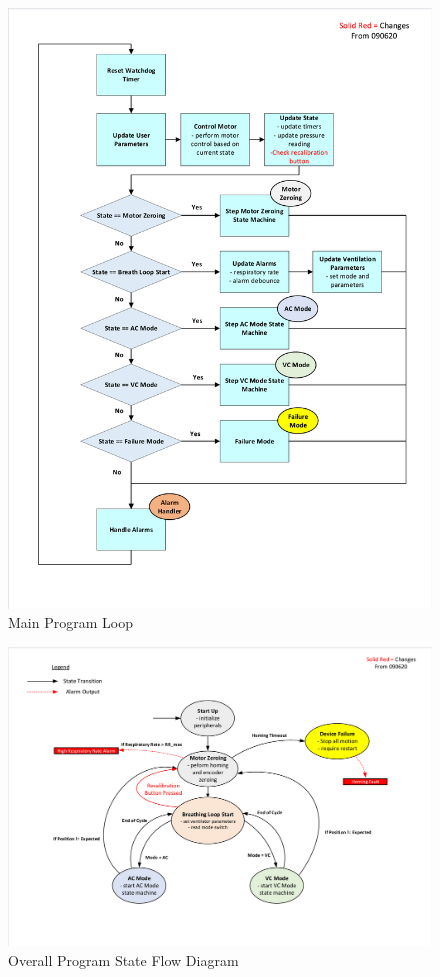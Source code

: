 \documentclass[]{article}
\begin{document}
\begin{appendices}
\begin{figure}
	\includegraphics[scale= 0.82, trim=15 60 15 60, clip]{figures/main_loop.pdf}
	\caption{Main Program Loop}
	\label{fig:main_loop}
\end{figure}

\begin{figure}
	\includegraphics[scale=0.8, trim = 6 6 6 6, clip]{figures/main_state_flow.pdf}
	\caption{Overall Program State Flow Diagram}
	\label{fig:main_stfd}
\end{figure}


\end{appendices}
\end{document}
